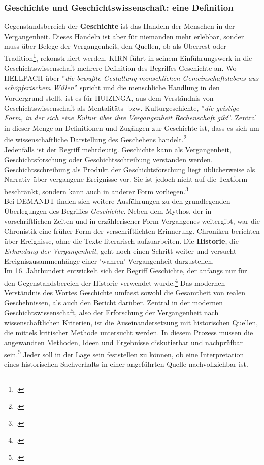 \documentclass[12pt,a4paper]{article}
\begin{document}
\subsubsection{Geschichte und Geschichtswissenschaft: eine Definition}
Gegenstandsbereich der \textbf{Geschichte} ist das Handeln der Menschen in der Vergangenheit. Dieses Handeln ist aber für niemanden mehr erlebbar, sonder muss über Belege der Vergangenheit, den Quellen, ob als Überrest oder Tradition\footcite[Die Unterscheidung nach DROYSEN zwischen ''unabsichtlich'' erzeugten (z.B. durch eine Ausgrabung gefundene Kleidung) und bewusst überlieferten Quellen (z.B. ein Denkmal),][S.49–55]{schulz2010neuere}, rekonstruiert werden. KIRN führt in seinem Einführungswerk in die Geschichtswissenschaft mehrere Definition des Begriffes Geschichte an. Wo HELLPACH über ''\textit{die bewußte Gestaltung menschlichen Gemeinschaftslebens aus schöpferischem Willen}'' spricht und die menschliche Handlung in den Vordergrund stellt, ist es für HUIZINGA, aus dem Verständnis von Geschichtswissenschaft als  Mentalitäts- bzw. Kulturgeschichte, ''\textit{die geistige Form, in der sich eine Kultur über ihre Vergangenheit Rechenschaft gibt}''. Zentral in dieser Menge an Definitionen und Zugängen zur Geschichte ist, dass es sich um die wissenschaftliche Darstellung des Geschehens handelt.\footcite[][S.7-12]{KirnPaul2015EidG}
\\
Jedenfalls ist der Begriff mehrdeutig. Geschichte kann als Vergangenheit, Geschichtsforschung oder Geschichtsschreibung verstanden werden. Geschichtsschreibung als Produkt der Geschichtsforschung liegt üblicherweise als Narrativ über vergangene Ereignisse vor. Sie ist jedoch nicht auf die Textform beschränkt, sondern kann auch in anderer Form vorliegen.\footcite[][S.5-7]{frank2018visualisierungswerkzeuge}
\\
Bei DEMANDT finden sich weitere Ausführungen zu den grundlegenden Überlegungen des Begriffes \textit{Geschichte}. Neben dem Mythos, der in vorschriftlichen Zeiten und in erzählerischer Form Vergangenes weitergibt, war die Chronistik eine früher Form der verschriftlichten Erinnerung. Chroniken berichten über Ereignisse, ohne die Texte literarisch aufzuarbeiten. Die \textbf{Historie}, die \textit{Erkundung der Vergangenheit}, geht noch einen Schritt weiter und versucht Ereigniszusammenhänge einer 'wahren' Vergangenheit darzustellen. 
\\
Im 16. Jahrhundert entwickelt sich der Begriff Geschichte, der anfangs nur für den Gegenstandsbereich der Historie verwendet wurde.\footcite[][S.57-58]{schulz2010neuere} Das modernen Verständnis des Wortes Geschichte umfasst sowohl die Gesamtheit von realen Geschehnissen, als auch den Bericht darüber. Zentral in der modernen Geschichtswissenschaft, also der Erforschung der Vergangenheit nach wissenschaftlichen Kriterien, ist die Auseinandersetzung mit historischen Quellen, die mittels kritischer Methode untersucht werden. In diesem Prozess müssen die angewandten Methoden, Ideen und Ergebnisse diskutierbar und nachprüfbar sein.\footcite[][S.13-32]{demand2011philosophie} Jeder soll in der Lage sein feststellen zu können, ob eine Interpretation eines historischen Sachverhalts in einer angeführten Quelle nachvollziehbar ist. 
\end{document}
